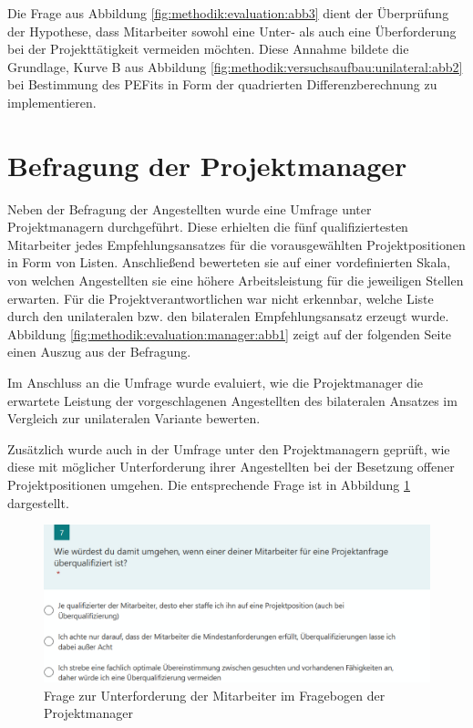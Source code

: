 Die Frage aus Abbildung \ref{fig:methodik:evaluation:abb3} dient der Überprüfung der Hypothese, dass Mitarbeiter sowohl eine Unter- als auch eine Überforderung bei der Projekttätigkeit vermeiden möchten. Diese Annahme bildete die Grundlage, Kurve B aus Abbildung \ref{fig:methodik:versuchsaufbau:unilateral:abb2} bei Bestimmung des \acp{PEFit} in Form der quadrierten Differenzberechnung zu implementieren.

\section{Befragung der Projektmanager}
\label{ch:methodik:evaluation:manager}
Neben der Befragung der Angestellten wurde eine Umfrage unter Projektmanagern durchgeführt. Diese erhielten die fünf qualifiziertesten Mitarbeiter jedes Empfehlungsansatzes für die vorausgewählten Projektpositionen in Form von Listen. Anschließend bewerteten sie auf einer vordefinierten Skala, von welchen Angestellten sie eine höhere Arbeitsleistung für die jeweiligen Stellen erwarten. Für die Projektverantwortlichen war nicht erkennbar,  welche Liste durch den unilateralen bzw. den bilateralen Empfehlungsansatz erzeugt wurde. Abbildung \ref{fig:methodik:evaluation:manager:abb1} zeigt auf der folgenden Seite einen Auszug aus der Befragung.

Im Anschluss an die Umfrage wurde evaluiert, wie die Projektmanager die erwartete Leistung der vorgeschlagenen Angestellten des bilateralen Ansatzes im Vergleich zur unilateralen Variante bewerten.

Zusätzlich wurde auch in der Umfrage unter den Projektmanagern geprüft, wie diese mit möglicher Unterforderung ihrer Angestellten bei der Besetzung offener Projektpositionen umgehen. Die entsprechende Frage ist in Abbildung \ref{fig:methodik:evaluation:manager:abb3} dargestellt.

\begin{figure}[h]
	\centering
	\includegraphics[width=1\textwidth]{gfx/umfrage-projektmanager-unterforderung.png}
	\caption{Frage zur Unterforderung der Mitarbeiter im Fragebogen der Projektmanager}
	\label{fig:methodik:evaluation:manager:abb3}
\end{figure}

